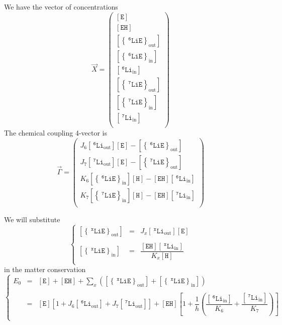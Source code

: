 \documentclass[aps,onecolumn,11pt]{revtex4}
\newcommand{\mychem}[1]{\mathtt{#1}}
\newcommand{\myconc}[1]{\left\lbrack{#1}\right\rbrack}
\newcommand{\spLi}[1]{{~^{\mychem{#1}}\mychem{Li}}}
\newcommand{\spEout}{\mychem{E}}
\newcommand{\Eout}{\myconc{\spEout}}
\newcommand{\spLiEin}[1]{\left\lbrace\spLi{#1}\spEout\right\rbrace_{\mathrm{in}}}
\newcommand{\LiEin}[1]{\myconc{\spLiEin{#1}}}
\newcommand{\spLiEout}[1]{\left\lbrace\spLi{#1}\spEout\right\rbrace_{\mathrm{out}}}
\newcommand{\LiEout}[1]{\myconc{\spLiEout{#1}}}
\newcommand{\spLiIn}[1]{{\spLi{#1}}_{\mathrm{in}}}
\newcommand{\LiIn}[1]{\myconc{\spLiIn{#1}}}
\newcommand{\spLiOut}[1]{{\spLi{#1}}_{\mathrm{out}}}
\newcommand{\LiOut}[1]{\myconc{\spLiOut{#1}}}
\newcommand{\spEHin}{\mychem{EH}}
\newcommand{\EHin}{\myconc{\spEHin}}
\newcommand{\spproton}{\mychem{H}}
\newcommand{\proton}{\myconc{\spproton}}
\begin{document}
We have the vector of concentrations
\begin{equation}
	\vec{X} = 
	\begin{pmatrix}
	\Eout\\
	\EHin\\
	\LiEout{6}\\
	\LiEin{6}\\
	\LiIn{6}\\
	\LiEout{7}\\
	\LiEin{7}\\
	\LiIn{7}\\
	\end{pmatrix}
\end{equation}
The chemical coupling 4-vector is
\begin{equation}
\vec{\Gamma} = 
\begin{pmatrix}
J_6 \LiOut{6} \Eout - \LiEout{6}\\
J_7 \LiOut{7} \Eout - \LiEout{7}\\
K_6 \LiEin{6}\proton - \EHin \LiIn{6}\\
K_7 \LiEin{7}\proton - \EHin \LiIn{7}\\
\end{pmatrix}
\end{equation}

We will substitute
\begin{equation}
\left\lbrace
\begin{array}{rcl}
	\LiEout{x} & = & J_x \LiOut{x} \Eout\\
	\\
	\LiEin{x}  & = & \dfrac{\EHin \LiIn{x}}{K_x\proton}\\
\end{array}
\right.
\end{equation}
in the matter conservation
\begin{equation}
\left\lbrace
\begin{array}{rcl}
	E_0 & = &\displaystyle \Eout + \EHin + \sum_x \left(\LiEout{x}+\LiEin{x}\right)\\
	\\
	& = & \Eout \left\lbrack1+J_6 \LiOut{6} + J_7 \LiOut{7}\right\rbrack + 
	\EHin 
	\left\lbrack
		1+\dfrac{1}{h}\left(\dfrac{\LiIn{6}}{K_6}+\dfrac{\LiIn{7}}{K_7}\right)
	\right\rbrack
	\\
\end{array}
\right.
\end{equation}
\end{document}
